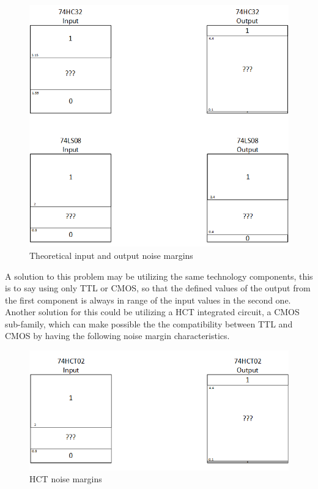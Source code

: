 \begin{figure}[h!]
        \centering
        \includegraphics[scale=0.45]{../Exercise5/Graficos5.png}
        \caption{\color{cyan}Theoretical input and output noise margins}
        \label{fig:ej5noisemargin}
\end{figure}

A solution to this problem may be utilizing the same technology components, this is to say using only TTL or CMOS, so that the defined values of the output from the first component is always in range of the input values in the second one. Another solution for this could be utilizing a HCT integrated circuit, a CMOS sub-family, which can make possible the the compatibility between TTL and CMOS by having the following noise margin characteristics. 

\begin{figure}[h!]
        \centering
        \includegraphics[scale=0.45]{../Exercise5/dataaa5.png}
        \caption{\color{cyan}HCT noise margins}
        \label{fig:ej5noisemargin}
\end{figure}


%